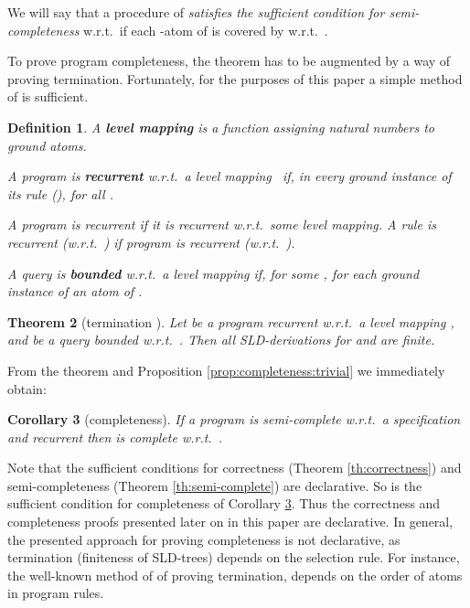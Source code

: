 \documentclass{tlp}
\newtheorem{theorem}{Theorem}
\newtheorem{corollary}[theorem]{Corollary}
\newtheorem{definition}[theorem]{Definition}
\begin{document}
We will say that a procedure  of 
{\em satisfies the sufficient condition for semi-completeness} w.r.t.\ 
if each -atom of  is covered by  w.r.t.\ .

To prove program completeness, the theorem has to be augmented by a way of
proving termination.  Fortunately, for the purposes of this paper 
a simple method of \cite{DBLP:journals/jlp/Bezem93} is sufficient.

\begin{definition}
A {\bf level mapping} is a
function  assigning natural numbers to ground atoms.

A program  is  {\bf recurrent} {w.r.t.\ a level mapping}~
\cite{DBLP:journals/jlp/Bezem93,Apt-Prolog} if, in
every ground instance   of its rule (),
 for all .

A program is {recurrent}
if it is recurrent w.r.t.\ some level mapping.   
A rule  is {recurrent} (w.r.t.\ ) if program 
is {recurrent} (w.r.t.\ ).


A query  is {\bf bounded} w.r.t.\ a level mapping   if, 
for some ,  for each ground instance  of an atom of .
\end{definition}
\vspace{-4pt}
\begin{theorem}
[termination {\rm\cite{DBLP:journals/jlp/Bezem93}}]
\label{th:termination}
Let  be a program recurrent w.r.t.\ a level mapping ,
and  be a query bounded w.r.t.\ .
Then all SLD-derivations for  and  are finite.
\end{theorem}




From the theorem and Proposition \ref{prop:completeness:trivial} we
immediately obtain: 
\begin{corollary}
[completeness]
\label{cor:completeness:recurrent}
If a program  is semi-complete w.r.t.\ a specification  and
recurrent
then  is complete w.r.t.~.
\end{corollary}

Note that the sufficient conditions for correctness (Theorem \ref{th:correctness})
and semi-completeness (Theorem \ref{th:semi-complete}) are declarative.  So is
the sufficient condition for completeness of Corollary
\ref{cor:completeness:recurrent}.
Thus the correctness and completeness proofs presented later on in this paper
are declarative. 
In general, the presented approach for proving completeness is not declarative,
as termination (finiteness of SLD-trees) depends on the selection rule.
For instance, the well-known method of \citeN{AP93} of proving termination,
depends on the order of atoms in program rules.
{\sloppy\par}
\end{document}
